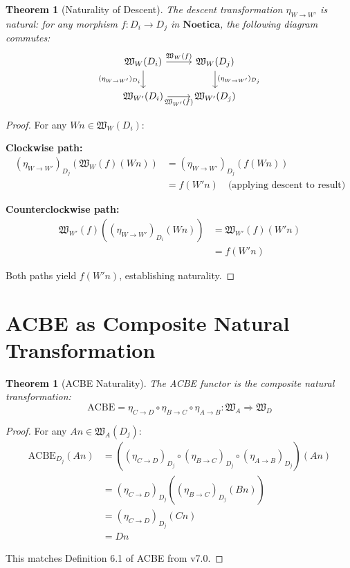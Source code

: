 \documentclass[11pt,twoside,openright]{book}
\theoremstyle{definition}
\theoremstyle{plain}
\newtheorem{theorem}[definition]{Theorem}
\theoremstyle{remark}
\newcommand{\Noetica}{\mathbf{Noetica}}
\newcommand{\NatTrans}[2]{\eta_{#1 \to #2}}
\newcommand{\WorldFunctor}[1]{\mathfrak{W}_{#1}}
\begin{document}
\begin{theorem}[Naturality of Descent]
\label{thm:descent-naturality}
The descent transformation $\NatTrans{W}{W'}$ is natural: for any morphism $f: D_i \to D_j$ in $\Noetica$, the following diagram commutes:
\[
\begin{tikzcd}
\WorldFunctor{W}(D_i) \arrow[r, "\WorldFunctor{W}(f)"] \arrow[d, "(\NatTrans{W}{W'})_{D_i}"']
  & \WorldFunctor{W}(D_j) \arrow[d, "(\NatTrans{W}{W'})_{D_j}"] \\
\WorldFunctor{W'}(D_i) \arrow[r, "\WorldFunctor{W'}(f)"']
  & \WorldFunctor{W'}(D_j)
\end{tikzcd}
\]
\end{theorem}

\begin{proof}
For any $Wn \in \WorldFunctor{W}(D_i)$:

\textbf{Clockwise path:}
\begin{align}
(\NatTrans{W}{W'})_{D_j}(\WorldFunctor{W}(f)(Wn)) &= (\NatTrans{W}{W'})_{D_j}(f(Wn)) \\
&= f(W'n) \quad \text{(applying descent to result)}
\end{align}

\textbf{Counterclockwise path:}
\begin{align}
\WorldFunctor{W'}(f)((\NatTrans{W}{W'})_{D_i}(Wn)) &= \WorldFunctor{W'}(f)(W'n) \\
&= f(W'n)
\end{align}

Both paths yield $f(W'n)$, establishing naturality.
\end{proof}

\section{ACBE as Composite Natural Transformation}

\begin{theorem}[ACBE Naturality]
\label{thm:acbe-natural}
The ACBE functor is the composite natural transformation:
\[
\mathrm{ACBE} = \NatTrans{C}{D} \circ \NatTrans{B}{C} \circ \NatTrans{A}{B} : \WorldFunctor{A} \Rightarrow \WorldFunctor{D}
\]
\end{theorem}

\begin{proof}
For any $An \in \WorldFunctor{A}(D_j)$:
\begin{align}
\mathrm{ACBE}_{D_j}(An) &= ((\NatTrans{C}{D})_{D_j} \circ (\NatTrans{B}{C})_{D_j} \circ (\NatTrans{A}{B})_{D_j})(An) \\
&= (\NatTrans{C}{D})_{D_j}((\NatTrans{B}{C})_{D_j}(Bn)) \\
&= (\NatTrans{C}{D})_{D_j}(Cn) \\
&= Dn
\end{align}

This matches Definition 6.1 of ACBE from v7.0.
\end{proof}
\end{document}
